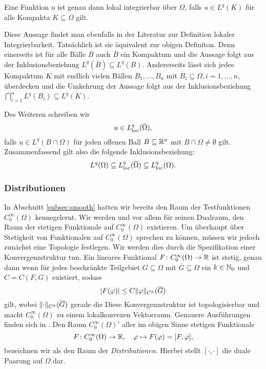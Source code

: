 \begin{bem}
  Eine Funktion $u$ ist genau dann lokal integrierbar über $\Omega$, falls $u \in L^q(K)$ für alle Kompakta $K \subseteq \Omega$ gilt.

  Diese Aussage findet man ebenfalls in der Literatur zur Definition lokaler Integrierbarkeit.
  Tatsächlich ist sie äquivalent zur obigen Definiton.
  Denn einerseits ist für alle Bälle $B$ auch $\overline B$ ein Kompaktum und die Aussage folgt aus der Inklusionsbeziehung $L^q(\overline B) \subseteq L^q(B)$.
  Andererseits lässt sich jedes Kompaktum $K$ mit endlich vielen Bällen $B_1, \dots, B_n$ mit $\overline B_i \subseteq \Omega, i =1,\dots,n,$ überdecken und die Umkehrung der Aussage folgt aus der Inklusionsbeziehung $\bigcap_{i = 1}^n L^q(B_i) \subseteq L^q(K)$.
\end{bem}

Des Weiteren schreiben wir
$$
u \in L^q_{\operatorname{loc}}(\overline\Omega),
$$
falls $u \in L^q(B \cap \Omega)$ für jeden offenen Ball $B \subseteq \mathbb{R}^n$ mit $B \cap \Omega \neq \emptyset$ gilt.
Zusammenfassend gilt also die folgende Inklusionsbeziehung:
$$
L^q(\Omega) \subseteq L^q_{\operatorname{loc}}(\overline\Omega) \subseteq L^q_{\operatorname{loc}}(\Omega).
$$

\subsubsection{Distributionen}

In Abschnitt \ref{subsec:smooth} hatten wir bereits den Raum der Testfunktionen $C_0^\infty(\Omega)$ kennegelernt.
Wir werden und vor allem für seinen Dualraum, den Raum der stetigen Funktionale auf $C_0^\infty(\Omega)$ existieren.
Um überhaupt über Stetigkeit von Funktionalen auf $C_0^\infty(\Omega)$ sprechen zu können, müssen wir jedoch zunächst eine Topologie festlegen.
Wir werden dies durch die Spezifikation einer Konvergenzstruktur tun.
Ein lineares Funktional $F \colon C_0^\infty(\Omega) \to \mathbb{R}$ ist stetig, genau dann wenn für jedes beschränkte Teilgebiet $G \subseteq \Omega$ mit $\overline G \subseteq \Omega$ ein $k \in \mathbb{N}_0$ und $C = C(F,G)$ existiert, sodass
$$
|F(\varphi)| \leq C \lVert \varphi \rVert_{C^k}(\overline G)
$$
gilt, wobei $\lVert \cdot \rVert_{C^k}(\overline G)$ gerade die
Diese Konvergenzstruktur ist topologisierbar und macht $C_0^\infty(\Omega)$ zu einem lokalkonvexen Vektorraum.
Genauere Ausführungen finden sich in \cite[S.433f.]{werner2011fa}.
Den Raum $C_0^\infty(\Omega)'$ aller im obigen Sinne stetigen Funktionale
$$
F \colon C_0^\infty(\Omega) \to \mathbb{R}, \quad \varphi \mapsto F(\varphi) = [F, \varphi],
$$
bezeichnen wir als den Raum der \emph{Distributionen}.
Hierbei stellt $[\cdot,\cdot]$ die duale Paarung auf $\Omega$ dar. 

